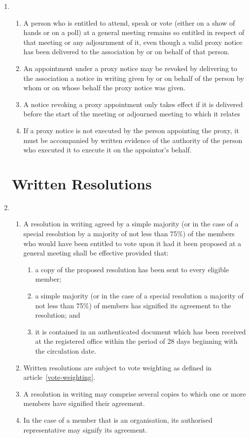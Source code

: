 \begin{enumerate}
\item
    \begin{enumerate}
        \item
        A person who is entitled to attend, speak or vote
        (either on a show of hands or on a poll) at a general meeting
        remains so entitled in respect of that meeting or any adjournment
        of it, even though a valid proxy notice has been delivered to the
        association by or on behalf of that person.
        \item
        An appointment under a
        proxy notice may be revoked by delivering to the association a notice
        in writing given by or on behalf of the person by whom or on whose
        behalf the proxy notice was given.
        \item
        A notice revoking a proxy
        appointment only takes effect if it is delivered before the start
        of the meeting or adjourned meeting to which it relates
        \item
        If a
        proxy notice is not executed by the person appointing the proxy, it
        must be accompanied by written evidence of the authority of the
        person who executed it to execute it on the appointor's behalf.
    \end{enumerate}

\section{Written Resolutions}

\item
  \begin{enumerate}
  \item
    A resolution in writing agreed by a simple majority (or in the case
    of a special resolution by a majority of not less than 75\%) of the
    members who would have been entitled to vote upon it had it been
    proposed at a general meeting shall be effective provided that:
    \begin{enumerate}
    \item
      a copy of the proposed resolution has been sent to every eligible
      member;
    \item
      a simple majority (or in the case of a special resolution a
      majority of not less than 75\%) of members has signified its
      agreement to the resolution; and
    \item
      it is contained in an authenticated document which has been
      received at the registered office within the period of 28 days
      beginning with the circulation date.
    \end{enumerate}
  \item
    Written resolutions are subject to vote weighting as defined in
    article~\ref{vote-weighting}.
  \item
    A resolution in writing may comprise several copies to which one or
    more members have signified their agreement.
  \item
    In the case of a member that is an organisation, its authorised
    representative may signify its agreement.
  \end{enumerate}


\end{enumerate}
